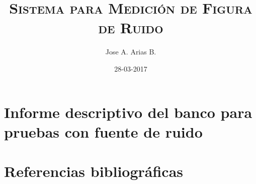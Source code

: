\documentclass{article}
\begin{document}
	\title{\textsc{Sistema para Medición de Figura de Ruido}} 
	\author{Jose A. Arias B.}
	\date{28-03-2017}
	\maketitle
	\clearpage
	
	
	\tableofcontents
	
	\clearpage
	
\section{Informe descriptivo del banco para pruebas con fuente de ruido}
	
	
			
		
		
	
	
	
	\section{Referencias bibliográficas}
		
	\printbibliography
\end{document}
